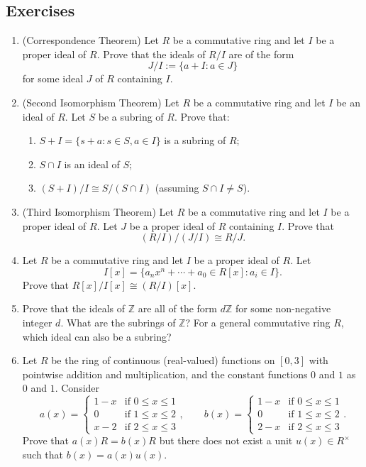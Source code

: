 \documentclass{article}
\def\Z{{\mathbb Z}}
\def\Z{{\mathbb Z}}
\begin{document}
\subsection*{Exercises}
\begin{enumerate}[\thesection .1]
    \item (Correspondence Theorem) Let $R$ be a commutative ring and let $I$ be a proper ideal of $R$. Prove that the ideals of $R/I$ are of the form $$J/I := \{a + I\colon a\in J\}$$
    for some ideal $J$ of $R$ containing $I$. 
    \item (Second Isomorphism Theorem) Let $R$ be a commutative ring and let $I$ be an ideal of $R$. Let $S$ be a subring of $R$. Prove that:
    \begin{enumerate}
        \item $S+I = \{s + a\colon s\in S, a\in I\}$ is a subring of $R$;
        \item $S\cap I$ is an ideal of $S$;
        \item $(S+I)/I\cong S/(S\cap I)$ (assuming $S\cap I\neq S$).
    \end{enumerate}
    \item (Third Isomorphism Theorem) Let $R$ be a commutative ring and let $I$ be a proper ideal of $R$. Let $J$ be a proper ideal of $R$ containing $I$. Prove that $$(R/I)/(J/I) \cong R/J.$$\label{exer:8.3}
    \item Let $R$ be a commutative ring and let $I$ be a proper ideal of $R$. Let $$I[x] = \{a_nx^n + \cdots + a_0 \in R[x]\colon a_i\in I\}.$$
    Prove that $R[x]/I[x] \cong (R/I)[x].$
    \item Prove that the ideals of $\Z$ are all of the form $d\Z$ for some non-negative integer $d$. What are the subrings of $\Z$? For a general commutative ring $R$, which ideal can also be a subring?
    \item Let $R$ be the ring of continuous (real-valued) functions on $[0,3]$ with pointwise addition and multiplication, and the constant functions $0$ and $1$ as $0$ and $1$. Consider
    $$a(x) = \begin{cases}
        1-x&\mbox{if }0\leq x\leq 1\\
        0&\mbox{if }1\leq x\leq 2\\
        x-2&\mbox{if }2\leq x\leq 3
    \end{cases},\qquad b(x) = \begin{cases}
        1-x&\mbox{if }0\leq x\leq 1\\
        0&\mbox{if }1\leq x\leq 2\\
        2-x&\mbox{if }2\leq x\leq 3
    \end{cases}.$$
    Prove that $a(x)R = b(x)R$ but there does not exist a unit $u(x)\in R^\times$ such that $b(x) = a(x)u(x)$.


\end{enumerate}
\end{document}
